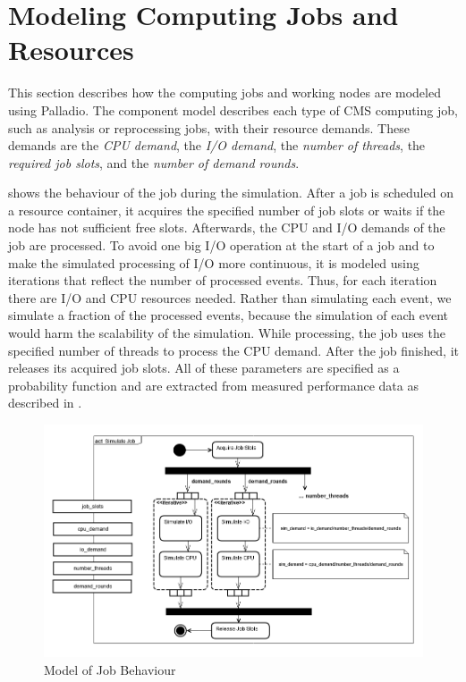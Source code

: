 \documentclass{webofc}
\begin{document}
\section{Modeling Computing Jobs and Resources}
\label{sec:model}
This section describes how the computing jobs and working nodes are modeled using Palladio.
The component model describes each type of CMS computing job, such as analysis or reprocessing jobs, with their resource demands. These demands are the \textit{CPU demand}, the\textit{ I/O demand}, the \textit{number of threads}, the \textit{required job slots}, and the \textit{number of demand rounds}.





 shows the behaviour of the job during the simulation. After a job is scheduled on a resource container, it acquires the specified number of job slots or waits if the node has not sufficient free slots. Afterwards, the CPU and I/O demands of the job are processed. To avoid one big I/O operation at the start of a job and to make the simulated processing of I/O more continuous, it is modeled using iterations that reflect the number of processed events. Thus, for each iteration there are I/O and CPU resources needed. Rather than simulating each event, we simulate a fraction of the processed events, because the simulation of each event would harm the scalability of the simulation. 
While processing, the job uses the specified number of threads to process the CPU demand. After the job finished, it releases its acquired job slots. All of these parameters are specified as a probability function and are extracted from measured performance data as described in .


\begin{figure}
	\centering
	\includegraphics[width=1\linewidth]{images/seff}
	\caption[]{Model of Job Behaviour}
	\label{seff}
\end{figure}
\end{document}
